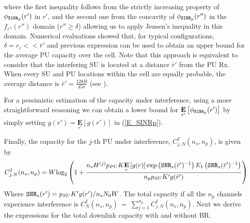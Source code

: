where the first inequality follows from the strictly increasing property of $\phi_{\text{\ttfamily{SINR}}_{p}}(r')$ in $r'$, and the second one from the concavity of $\phi_{\text{\ttfamily{SINR}}_{p}}(r'')$ in the $f_{r''}(r'')$ domain ($r''\geq\delta$) allowing us to apply Jensen's inequality in this domain. Numerical evaluations showed that, for typical configurations, $\delta=r_{c}<<\bar{r}'$ and previous expression can be used to obtain an upper bound for the average PU capacity over the cell. Note that this approach is equivalent to consider that the interfering SU is located at a distance $\bar{r}'$ from the PU Rx. When every SU and PU locations within the cell are equally probable, the average distance is $\bar{r}' = \frac{128R}{45\pi}$ (see \cite{ref:Solomon}). 

For a pessimistic estimation of the capacity under interference, using a more straightforward reasoning we can obtain a lower bound for $\underset{r'}{\mathbf{E}}\left[\phi_{\text{\ttfamily{SINR}}_{p}}(r')\right]$ by simply setting $g(r')=\underset{r'}{\mathbf{E}}\left[g(r')\right]$ in (\ref{E_SINRp}).


Finally, the capacity for the $j$-th PU under interference, $C^{I}_{j,N}(n_{s},n_{p})$, is given by
\begin{equation}\label{CIjN}
C^{I}_{j,N}(n_{s},n_{p}) = \\
W\text{log}_{2}\left(1+
\frac{n_{s}H^{(j)}p_{PU}K\underset{r}{\mathbf{E}}\left[g(r)\right]\text{exp}\left(\text{\ttfamily{SNR}}_{s}(\bar{r}')^{-1}\right)E_{1}\left(\text{\ttfamily{SNR}}_{s}(\bar{r}')^{-1}\right)}
{n_{p}p_{SU}K'g(\bar{r}')}\right)
\end{equation}
Where $\text{\ttfamily{SNR}}_{s}(r') = p_{SU}K'g(r')/n_{s}N_{0}W$.
The total capacity if all the $n_{p}$ channels experience interference is $C^{I}_{N}(n_{s},n_{p})~=~\sum_{j=1}^{n_{p}}C^{I}_{j,N}(n_{s},n_{p})$.
Next we derive the expressions for the total downlink capacity with and without BR.


